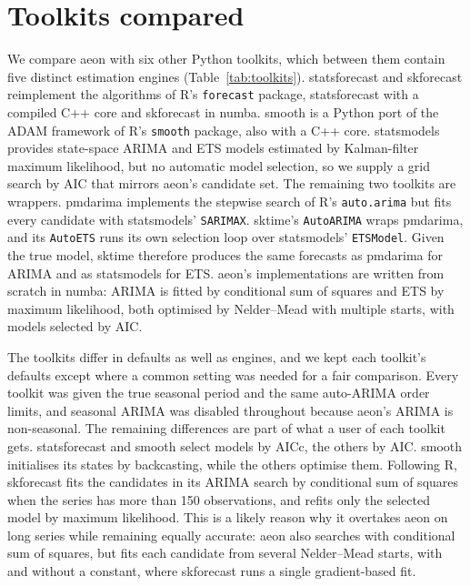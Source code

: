 \documentclass[11pt]{article}
\begin{document}
\section*{Toolkits compared}

We compare aeon with six other Python toolkits, which between them contain
five distinct estimation engines (Table~\ref{tab:toolkits}). statsforecast and
skforecast reimplement the algorithms of R's \texttt{forecast} package,
statsforecast with a compiled C++ core and skforecast in numba. smooth is a
Python port of the ADAM framework of R's \texttt{smooth} package, also with a
C++ core. statsmodels provides state-space ARIMA and ETS models estimated by
Kalman-filter maximum likelihood, but no automatic model selection, so we
supply a grid search by AIC that mirrors aeon's candidate set. The remaining
two toolkits are wrappers. pmdarima implements the stepwise search of R's
\texttt{auto.arima} but fits every candidate with statsmodels'
\texttt{SARIMAX}. sktime's \texttt{AutoARIMA} wraps pmdarima, and its
\texttt{AutoETS} runs its own selection loop over statsmodels'
\texttt{ETSModel}. Given the true model, sktime therefore produces the same
forecasts as pmdarima for ARIMA and as statsmodels for ETS. aeon's
implementations are written from scratch in numba: ARIMA is fitted by
conditional sum of squares and ETS by maximum likelihood, both optimised by
Nelder--Mead with multiple starts, with models selected by AIC.

The toolkits differ in defaults as well as engines, and we kept each toolkit's
defaults except where a common setting was needed for a fair comparison. Every
toolkit was given the true seasonal period and the same auto-ARIMA order
limits, and seasonal ARIMA was disabled throughout because aeon's ARIMA is
non-seasonal. The remaining differences are part of what a user of each
toolkit gets. statsforecast and smooth select models by AICc, the others by
AIC. smooth initialises its states by backcasting, while the others optimise
them. Following R, skforecast fits the candidates in its ARIMA search by
conditional sum of squares when the series has more than 150 observations, and
refits only the selected model by maximum likelihood. This is a likely reason
why it overtakes aeon on long series while remaining equally accurate: aeon
also searches with conditional sum of squares, but fits each candidate from
several Nelder--Mead starts, with and without a constant, where skforecast
runs a single gradient-based fit.
\end{document}
